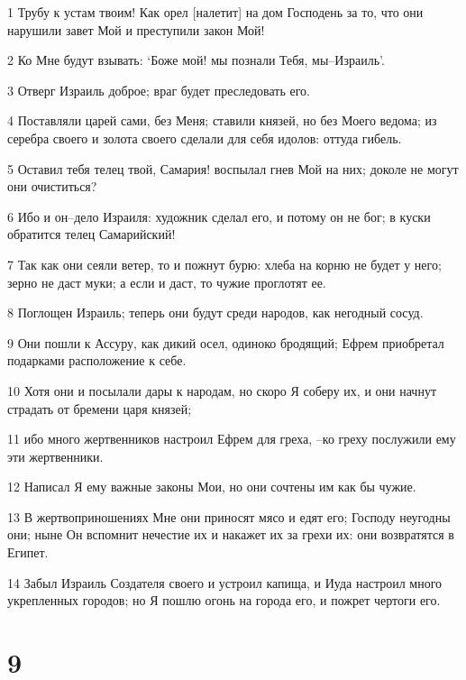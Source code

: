 \par 1 Трубу к устам твоим! Как орел [налетит] на дом Господень за то, что они нарушили завет Мой и преступили закон Мой!
\par 2 Ко Мне будут взывать: `Боже мой! мы познали Тебя, мы--Израиль'.
\par 3 Отверг Израиль доброе; враг будет преследовать его.
\par 4 Поставляли царей сами, без Меня; ставили князей, но без Моего ведома; из серебра своего и золота своего сделали для себя идолов: оттуда гибель.
\par 5 Оставил тебя телец твой, Самария! воспылал гнев Мой на них; доколе не могут они очиститься?
\par 6 Ибо и он--дело Израиля: художник сделал его, и потому он не бог; в куски обратится телец Самарийский!
\par 7 Так как они сеяли ветер, то и пожнут бурю: хлеба на корню не будет у него; зерно не даст муки; а если и даст, то чужие проглотят ее.
\par 8 Поглощен Израиль; теперь они будут среди народов, как негодный сосуд.
\par 9 Они пошли к Ассуру, как дикий осел, одиноко бродящий; Ефрем приобретал подарками расположение к себе.
\par 10 Хотя они и посылали дары к народам, но скоро Я соберу их, и они начнут страдать от бремени царя князей;
\par 11 ибо много жертвенников настроил Ефрем для греха, --ко греху послужили ему эти жертвенники.
\par 12 Написал Я ему важные законы Мои, но они сочтены им как бы чужие.
\par 13 В жертвоприношениях Мне они приносят мясо и едят его; Господу неугодны они; ныне Он вспомнит нечестие их и накажет их за грехи их: они возвратятся в Египет.
\par 14 Забыл Израиль Создателя своего и устроил капища, и Иуда настроил много укрепленных городов; но Я пошлю огонь на города его, и пожрет чертоги его.

\chapter{9}


